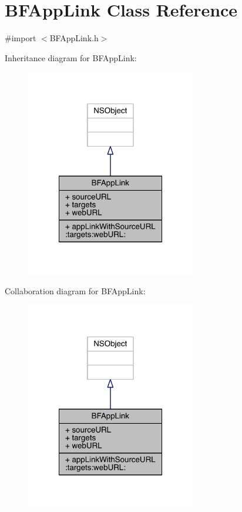 \hypertarget{interface_b_f_app_link}{\section{B\-F\-App\-Link Class Reference}
\label{interface_b_f_app_link}
}


{\ttfamily \#import $<$B\-F\-App\-Link.\-h$>$}



Inheritance diagram for B\-F\-App\-Link\-:
\nopagebreak
\begin{figure}[H]
\begin{center}
\leavevmode
\includegraphics[width=210pt]{interface_b_f_app_link__inherit__graph}
\end{center}
\end{figure}


Collaboration diagram for B\-F\-App\-Link\-:
\nopagebreak
\begin{figure}[H]
\begin{center}
\leavevmode
\includegraphics[width=210pt]{interface_b_f_app_link__coll__graph}
\end{center}
\end{figure}
